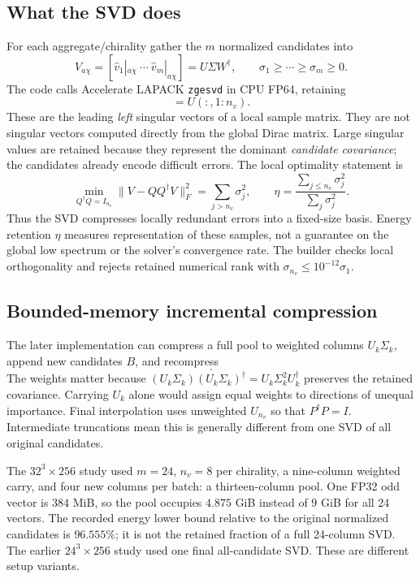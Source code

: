 \documentclass[11pt]{article}
\newcommand{\adj}{^{\dagger}}
\newcommand{\file}[1]{\nolinkurl{#1}}
\begin{document}
\subsection{What the SVD does}
For each aggregate/chirality gather the $m$ normalized candidates into
\begin{equation}
 V_{a\chi}=[\widehat v_1|_{a\chi}\ \cdots\ \widehat v_m|_{a\chi}]
   =U\Sigma W\adj,\qquad \sigma_1\geq\cdots\geq\sigma_m\geq0.
\end{equation}
The code calls Accelerate LAPACK \file{zgesvd} in CPU FP64, retaining
\begin{equation}
 [p_{a\chi1},\ldots,p_{a\chi n_v}]=U(:,1:n_v).
\end{equation}
These are the leading \emph{left} singular vectors of a local sample matrix.
They are not singular vectors computed directly from the global Dirac matrix.
Large singular values are retained because they represent the dominant
\emph{candidate covariance}; the candidates already encode difficult errors.
The local optimality statement is
\begin{equation}
 \min_{Q\adj Q=I_{n_v}}\|V-QQ\adj V\|_F^2
 =\sum_{j>n_v}\sigma_j^2,\qquad
 \eta=\frac{\sum_{j\leq n_v}\sigma_j^2}{\sum_j\sigma_j^2}.
\end{equation}
Thus the SVD compresses locally redundant errors into a fixed-size basis.
Energy retention $\eta$ measures representation of these samples, not a
guarantee on the global low spectrum or the solver's convergence rate.
The builder checks local orthogonality and rejects retained numerical rank
with $\sigma_{n_v}\leq10^{-12}\sigma_1$.

\subsection{Bounded-memory incremental compression}
The later implementation can compress a full pool to weighted columns
$U_k\Sigma_k$, append new candidates $B$, and recompress
\begin{equation}
 [\,U_k\Sigma_k\ \ B\,].
\end{equation}
The weights matter because
$(U_k\Sigma_k)(U_k\Sigma_k)\adj=U_k\Sigma_k^2U_k\adj$ preserves the
retained covariance. Carrying $U_k$ alone would assign equal weights to
directions of unequal importance. Final interpolation uses unweighted $U_{n_v}$
so that $P\adj P=I$. Intermediate truncations mean this is generally different
from one SVD of all original candidates.

The $32^3\times256$ study used $m=24$, $n_v=8$ per chirality, a nine-column
weighted carry, and four new columns per batch: a thirteen-column pool.
One FP32 odd vector is $384$ MiB, so the pool occupies $4.875$ GiB instead of
$9$ GiB for all 24 vectors. The recorded energy lower bound relative to the
original normalized candidates is $96.555\%$; it is not the retained fraction
of a full 24-column SVD. The earlier $24^3\times256$ study used one final
all-candidate SVD. These are different setup variants.
\end{document}
